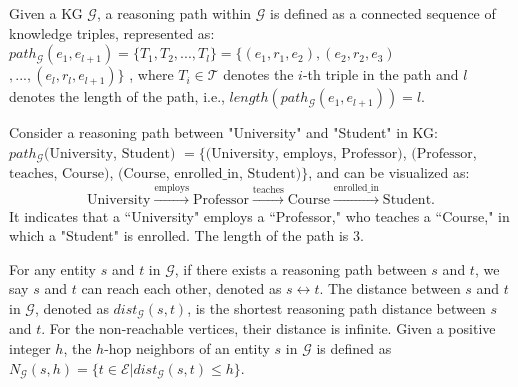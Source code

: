 






\begin{definition} 
Given a KG $\mathcal{G}$,
a reasoning path within $\mathcal{G}$ is defined as a connected sequence of knowledge triples, represented as: $path_{\mathcal{G}}(e_1, e_{l+1}) = \{ T_1, T_2, ..., T_l \} = \{(e_1,r_1,e_2),(e_2,r_2,e_3)$ $,...,(e_{l},r_l,e_{l+1})   \}$ , where $T_i \in \mathcal{T}$ denotes the $i$-th triple in the path and $l$ denotes the length of the path, i.e., $length(path_{\mathcal{G}}(e_1, e_{l+1})) = l$.

\end{definition}


\begin{example}

Consider a reasoning path between "University" and "Student" in KG:
$
path_{\mathcal{G}}(\text{University}$, $ \text{Student}) $ $= \{(\text{University}$, $\text{employs}$, $\text{Professor})$, $ (\text{Professor}$, $\text{teaches}$, $\text{Course})$, $ (\text{Course}$, $\text{enrolled\_in}$, $\text{Student})\}
$, and can be visualized as: 
\[
\text{University} \xrightarrow{\text{employs}} \text{Professor} \xrightarrow{\text{teaches}} \text{Course} \xrightarrow{\text{enrolled\_in}} \text{Student}.
\]
\noindent It indicates that a ``University" employs a ``Professor," who teaches a ``Course," in which a "Student" is enrolled. The length of the path is 3.

\end{example}



For any entity $s$ and $t$ in $\mathcal{G}$, if there exists a reasoning path between $s$ and $t$, we say $s$ and $t$ can reach each other, denoted as $s \leftrightarrow t$. 
The distance between $s$ and $t$ in $\mathcal{G}$, denoted as $dist_\mathcal{G}(s,t)$, is the shortest reasoning path distance between $s$ and $t$. For the non-reachable vertices, their distance is infinite.
Given a positive integer $h$, the $h$-hop neighbors of an entity $s$ in $\mathcal{G}$ is defined as $N_\mathcal{G}(s, h)=\{t\in \mathcal{E} |dist_\mathcal{G}(s,t)\leq h\}$. 


